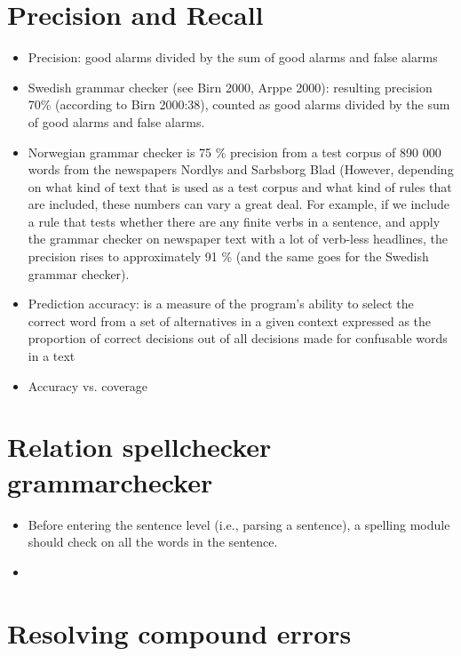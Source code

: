 \documentclass[a4paper,english,12pt]{article}
\begin{document}
\begin{spacing}{1.0}
\section{Precision and Recall}

\begin{itemize}
\item Precision: good alarms divided by the sum of good alarms and false alarms
\item Swedish grammar checker (see Birn 2000, Arppe 2000): resulting precision 70\% (according to Birn 2000:38), counted as good alarms divided by the sum of good alarms and false alarms. 
\item Norwegian grammar checker is 75 \% precision from a test corpus of 890 000 words from the newspapers Nordlys and Sarbsborg Blad \citet{Hagen2001a} (However, depending on what kind of text that is used as a test corpus and what kind of rules that are included, these numbers can vary a great deal. For example, if we include a rule that tests whether there are any finite verbs in a sentence, and apply the grammar checker on newspaper text with a lot of verb-less headlines, the precision rises to approximately 91 \% (and the same goes for the Swedish grammar checker).
\item Prediction accuracy: is a measure of the program's ability to select the correct word from a set of alternatives in a given context expressed as the proportion of correct decisions out of all decisions made for confusable words in a text \citet{Pedler2007} 
\item Accuracy vs. coverage \citet[p.186]{Pedler2007}
\end{itemize}

\section{Relation spellchecker grammarchecker}

\begin{itemize}
\item Before entering the sentence level (i.e., parsing a sentence), a spelling module should check on all the words in the sentence. \citet{Vosse1992}
\item
\end{itemize}

\section{Resolving compound errors}


\end{spacing}
\end{document}
